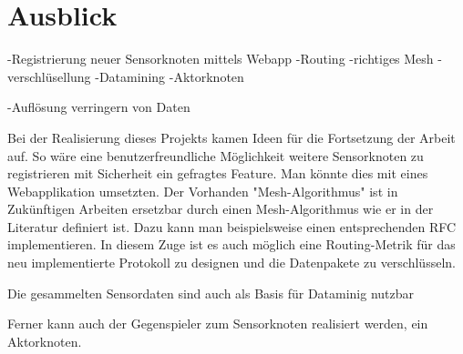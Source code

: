 \section{Ausblick}
-Registrierung neuer Sensorknoten mittels Webapp
-Routing
-richtiges Mesh
-verschlüsellung
-Datamining
-Aktorknoten

-Auflösung verringern von Daten

Bei der Realisierung dieses Projekts kamen Ideen für die Fortsetzung der Arbeit auf. So wäre eine benutzerfreundliche Möglichkeit weitere Sensorknoten zu registrieren mit Sicherheit ein gefragtes Feature. Man könnte dies mit eines Webapplikation umsetzten.
Der Vorhanden "Mesh-Algorithmus" ist in Zukünftigen Arbeiten ersetzbar durch einen Mesh-Algorithmus wie er in der Literatur definiert ist. Dazu kann man beispielsweise einen entsprechenden RFC implementieren. In diesem Zuge ist es auch möglich eine Routing-Metrik für das neu implementierte Protokoll zu designen und die Datenpakete zu verschlüsseln. 

Die gesammelten Sensordaten sind auch als Basis für Dataminig nutzbar

Ferner kann auch der Gegenspieler zum Sensorknoten realisiert werden, ein Aktorknoten.

 
